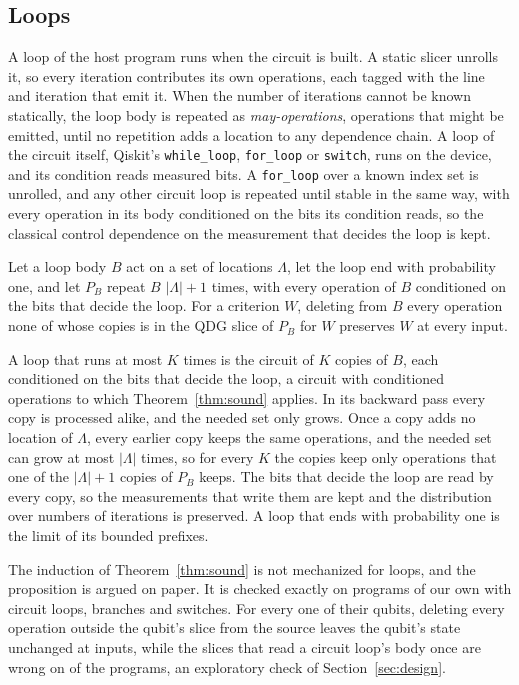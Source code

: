 \subsection{Loops}\label{sec:loops}
A loop of the host program runs when the circuit is built. A static slicer unrolls it, so every iteration
contributes its own operations, each tagged with the line and iteration that emit it. When the number of iterations
cannot be known statically, the loop body is repeated as \emph{may-operations}, operations that might be emitted,
until no repetition adds a location to any dependence chain. A loop of the circuit itself, Qiskit's
\texttt{while\_loop}, \texttt{for\_loop} or \texttt{switch}, runs on the device, and its condition reads measured
bits. A \texttt{for\_loop} over a known index set is unrolled, and any other circuit loop is repeated until stable
in the same way, with every operation in its body conditioned on the bits its condition reads, so the classical
control dependence on the measurement that decides the loop is kept.

\begin{proposition}[Loops]\label{prop:loops}
Let a loop body $B$ act on a set of locations $\Lambda$, let the loop end with probability one, and let $P_B$ repeat
$B$ $|\Lambda| + 1$ times, with every operation of $B$ conditioned on the bits that decide the loop. For a
criterion $W$, deleting from $B$ every operation none of whose copies is in the QDG slice of $P_B$ for $W$ preserves
$W$ at every input.
\end{proposition}

\begin{IEEEproof}
A loop that runs at most $K$ times is the circuit of $K$ copies of $B$, each conditioned on the bits that decide
the loop, a circuit with conditioned operations to which Theorem~\ref{thm:sound} applies. In its backward pass every
copy is processed alike, and the needed set only grows. Once a copy adds no location of $\Lambda$, every earlier copy
keeps the same operations, and the needed set can grow at most $|\Lambda|$ times, so for every $K$ the copies keep
only operations that one of the $|\Lambda| + 1$ copies of $P_B$ keeps. The bits that decide the loop are read by
every copy, so the measurements that write them are kept and the distribution over numbers of iterations is
preserved. A loop that ends with probability one is the limit of its bounded prefixes.
\end{IEEEproof}

The induction of Theorem~\ref{thm:sound} is not mechanized for loops, and the proposition is argued on paper. It is
checked exactly on \numCfPrograms{} programs of our own with circuit loops, branches and switches. For every one of
their \numCfQubits{} qubits, deleting every operation outside the qubit's slice from the source leaves the qubit's
state unchanged at \numCfInputs{} inputs, while the slices that read a circuit loop's body once are wrong on
\numCfOldWrong{} of the \numCfPrograms{} programs, an exploratory check of Section~\ref{sec:design}.
